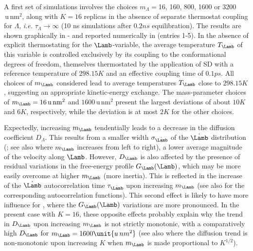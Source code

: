 A first set of simulations involves the choices $m_{\Lambda}=$16, 160, 800, 1600 or 3200$\,\mathrm{u}\,\mathrm{nm}^2$,
      along with $K=16$ replicas in the absence of separate thermostat coupling 
      for $\Lambda$, {\em i.e.} $\tau_\Lambda\rightarrow\infty$
      (10 ns simulations after $0.2\unit{ns}$ equilibration).
%
The results are shown graphically in  -  and reported numerically in  (entries 1-5).
%
In the absence of explicit
thermostating for the $\Lamb$-variable, the average
temperature $T_{\Lamb}$ of this variable is controlled exclusively by its 
coupling to the conformational degrees of freedom, 
themselves thermostated by the application of SD with a reference temperature of $298.15\unit{K}$
and an effective coupling time of $0.1\unit{ps}$.
%
All choices of $m_{\Lamb}$ considered lead to average temperatures $T_\Lamb$
close to $298.15\unit{K}$, suggesting an appropriate kinetic-energy exchange.
 The mass-parameter
choices of  $m_\Lamb=16\,\mathrm{u\,nm^2}$ 
and $1600\,\mathrm{u\,nm^2}$ present the largest deviations of about $10\unit{K}$ and $6\unit{K}$,
respectively, while the deviation is at most $2\unit{K}$ for the other choices.


Expectedly, increasing $m_{\Lamb}$ tendentially leads to a decrease in the
diffusion coefficient $D_\Lambda$.
%
This results from a smaller width $\sigma_{\dot{\Lamb}}$ of the $\dot{\Lamb}$ distribution 
(; see also  where $m_{\Lamb}$ increases from left to right),
\ie{} a lower average magnitude of the velocity along $\Lamb$. 
However, $D_{\Lamb}$ is also affected by the presence of residual variations 
in the free-energy profile $G_{\Lamb}(\Lamb)$, which may be more easily overcome at higher $m_{\Lamb}$
(more inertia). This is reflected in the increase of the $\dot{\Lamb}$ autocorrelation time $\tau_{\dot{\Lamb}}$ upon increasing $m_{\Lamb}$ (see also  for the corresponding  autocorrelation functions). This second effect is likely to have more influence for ,
where the $G_{\Lamb}(\Lamb)$ variations are more pronounced. 
In the present case with $K=16$, these opposite effects probably 
explain why the trend in $D_{\Lamb}$ upon increasing $m_{\Lamb}$ is not strictly
monotonic, with a comparatively high $D_{\Lamb}$ for 
$m_{\Lamb}=1600\unit{u\,nm^2}$ (see also  where the diffusion trend is non-monotonic
upon increasing $K$ when  $m_{\Lamb}$ is made proportional to $K^{1/2}$).



